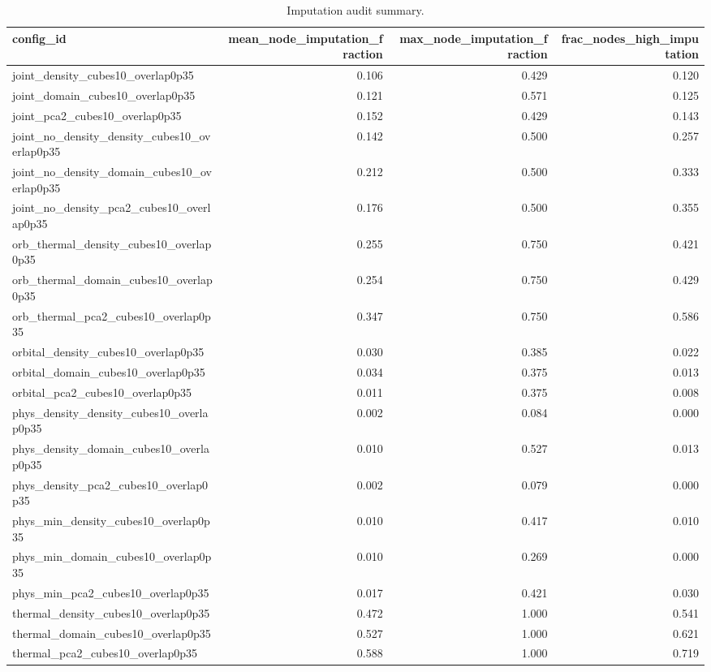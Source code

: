 \begin{table}[p]
\centering
\caption{Imputation audit summary.}
\label{tab:mapper_imputation_audit_summary}
\begin{adjustbox}{max width=\linewidth}
\begin{tabular}{lrrr}
\toprule
config\_id & mean\_node\_imputation\_fraction & max\_node\_imputation\_fraction & frac\_nodes\_high\_imputation \\
\midrule
joint\_density\_cubes10\_overlap0p35 & 0.106 & 0.429 & 0.120 \\
joint\_domain\_cubes10\_overlap0p35 & 0.121 & 0.571 & 0.125 \\
joint\_pca2\_cubes10\_overlap0p35 & 0.152 & 0.429 & 0.143 \\
joint\_no\_density\_density\_cubes10\_overlap0p35 & 0.142 & 0.500 & 0.257 \\
joint\_no\_density\_domain\_cubes10\_overlap0p35 & 0.212 & 0.500 & 0.333 \\
joint\_no\_density\_pca2\_cubes10\_overlap0p35 & 0.176 & 0.500 & 0.355 \\
orb\_thermal\_density\_cubes10\_overlap0p35 & 0.255 & 0.750 & 0.421 \\
orb\_thermal\_domain\_cubes10\_overlap0p35 & 0.254 & 0.750 & 0.429 \\
orb\_thermal\_pca2\_cubes10\_overlap0p35 & 0.347 & 0.750 & 0.586 \\
orbital\_density\_cubes10\_overlap0p35 & 0.030 & 0.385 & 0.022 \\
orbital\_domain\_cubes10\_overlap0p35 & 0.034 & 0.375 & 0.013 \\
orbital\_pca2\_cubes10\_overlap0p35 & 0.011 & 0.375 & 0.008 \\
phys\_density\_density\_cubes10\_overlap0p35 & 0.002 & 0.084 & 0.000 \\
phys\_density\_domain\_cubes10\_overlap0p35 & 0.010 & 0.527 & 0.013 \\
phys\_density\_pca2\_cubes10\_overlap0p35 & 0.002 & 0.079 & 0.000 \\
phys\_min\_density\_cubes10\_overlap0p35 & 0.010 & 0.417 & 0.010 \\
phys\_min\_domain\_cubes10\_overlap0p35 & 0.010 & 0.269 & 0.000 \\
phys\_min\_pca2\_cubes10\_overlap0p35 & 0.017 & 0.421 & 0.030 \\
thermal\_density\_cubes10\_overlap0p35 & 0.472 & 1.000 & 0.541 \\
thermal\_domain\_cubes10\_overlap0p35 & 0.527 & 1.000 & 0.621 \\
thermal\_pca2\_cubes10\_overlap0p35 & 0.588 & 1.000 & 0.719 \\
\bottomrule
\end{tabular}
\end{adjustbox}
\end{table}

